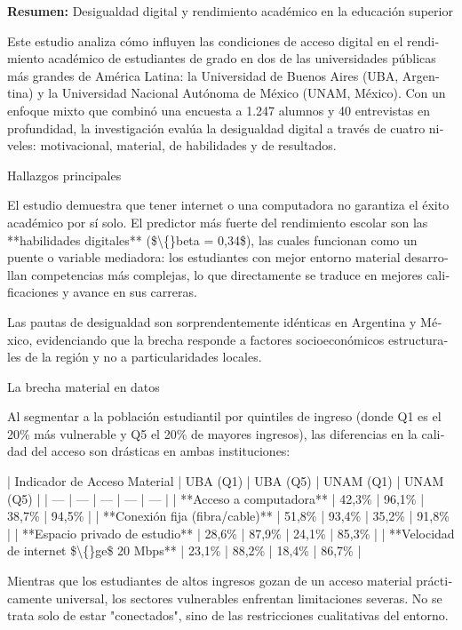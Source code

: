 \begin{tcolorbox}[colback=brown!8!white,colframe=brown!8!white,boxrule=0pt,arc=2pt,left=4pt,right=4pt,top=3pt,bottom=3pt,before skip=4pt,after skip=4pt]
\begin{otherlanguage}{spanish}
\sffamily\small \textbf{Resumen:} Desigualdad digital y rendimiento académico en la educación superior

Este estudio analiza cómo influyen las condiciones de acceso digital en el rendimiento académico de estudiantes de grado en dos de las universidades públicas más grandes de América Latina: la Universidad de Buenos Aires (UBA, Argentina) y la Universidad Nacional Autónoma de México (UNAM, México). Con un enfoque mixto que combinó una encuesta a 1.247 alumnos y 40 entrevistas en profundidad, la investigación evalúa la desigualdad digital a través de cuatro niveles: motivacional, material, de habilidades y de resultados.

Hallazgos principales

El estudio demuestra que tener internet o una computadora no garantiza el éxito académico por sí solo. El predictor más fuerte del rendimiento escolar son las **habilidades digitales** (\$\textbackslash\{\}beta = 0,34\$), las cuales funcionan como un puente o variable mediadora: los estudiantes con mejor entorno material desarrollan competencias más complejas, lo que directamente se traduce en mejores calificaciones y avance en sus carreras.

Las pautas de desigualdad son sorprendentemente idénticas en Argentina y México, evidenciando que la brecha responde a factores socioeconómicos estructurales de la región y no a particularidades locales.

La brecha material en datos

Al segmentar a la población estudiantil por quintiles de ingreso (donde Q1 es el 20\% más vulnerable y Q5 el 20\% de mayores ingresos), las diferencias en la calidad del acceso son drásticas en ambas instituciones:

| Indicador de Acceso Material | UBA (Q1) | UBA (Q5) | UNAM (Q1) | UNAM (Q5) |
| --- | --- | --- | --- | --- |
| **Acceso a computadora** | 42,3\% | 96,1\% | 38,7\% | 94,5\% |
| **Conexión fija (fibra/cable)** | 51,8\% | 93,4\% | 35,2\% | 91,8\% |
| **Espacio privado de estudio** | 28,6\% | 87,9\% | 24,1\% | 85,3\% |
| **Velocidad de internet \$\textbackslash\{\}ge\$ 20 Mbps** | 23,1\% | 88,2\% | 18,4\% | 86,7\% |

Mientras que los estudiantes de altos ingresos gozan de un acceso material prácticamente universal, los sectores vulnerables enfrentan limitaciones severas. No se trata solo de estar "conectados", sino de las restricciones cualitativas del entorno.


\end{otherlanguage}
\end{tcolorbox}

